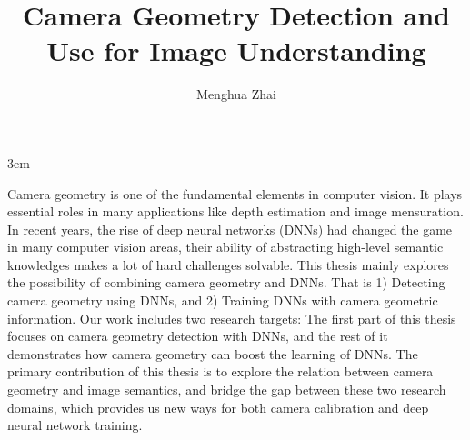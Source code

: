 \documentclass[final]{ukthesis}
\newcommand{\disstitle}{Camera Geometry Detection and Use for Image
Understanding}
\begin{document}
\emergencystretch 3em

\author{Menghua Zhai}
\title{\disstitle}

\abstract
{
  \SingleSpacing
  Camera geometry is one of the fundamental elements in computer vision.
  It plays essential roles in many applications like depth estimation
  and image mensuration. 
  In recent years, the rise of deep neural networks (DNNs) had changed
  the game in many computer vision areas, their ability of abstracting
  high-level semantic knowledges makes a lot of hard challenges
  solvable. 
  This thesis mainly explores the possibility of combining camera
  geometry and DNNs. That is 1) Detecting camera geometry using DNNs,
  and 2) Training DNNs with camera geometric information.  Our work
  includes two research targets: The first part of this thesis focuses
  on camera geometry detection with DNNs, and the rest of it
  demonstrates how camera geometry can boost the learning of DNNs.
  The primary contribution of this thesis is to explore the relation
  between camera geometry and image semantics, and bridge the gap
  between these two research domains, which provides us new ways for
  both camera calibration and deep neural network training.
}


\frontmatter
\maketitle



\tableofcontents\clearpage

\mainmatter




\backmatter




\end{document}
